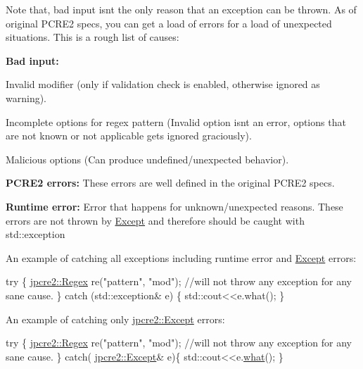 Note that, bad input isn\textquotesingle{}t the only reason that an exception can be thrown. As of original P\+C\+R\+E2 specs, you can get a load of errors for a load of unexpected situations. This is a rough list of causes\+:


\begin{DoxyEnumerate}
\item {\bfseries Bad input\+:}
\begin{DoxyEnumerate}
\item Invalid modifier (only if validation check is enabled, otherwise ignored as warning).
\item Incomplete options for regex pattern (Invalid option isn\textquotesingle{}t an error, options that are not known or not applicable gets ignored graciously).
\item Malicious options (Can produce undefined/unexpected behavior).
\end{DoxyEnumerate}
\item {\bfseries P\+C\+R\+E2 errors\+:} These errors are well defined in the original P\+C\+R\+E2 specs.
\item {\bfseries Runtime error\+:} Error that happens for unknown/unexpected reasons. These errors are not thrown by \hyperlink{classjpcre2_1_1Except}{Except} and therefore should be caught with std\+::exception
\end{DoxyEnumerate}

An example of catching all exceptions including runtime error and \hyperlink{classjpcre2_1_1Except}{Except} errors\+:


\begin{DoxyCode}
\textcolor{keywordflow}{try} \{
    \hyperlink{classjpcre2_1_1Regex}{jpcre2::Regex} re(\textcolor{stringliteral}{"pattern"}, \textcolor{stringliteral}{"mod"}); \textcolor{comment}{//will not throw any exception for any sane cause.}
\} \textcolor{keywordflow}{catch} (std::exception& e) \{
    std::cout<<e.what();
\}
\end{DoxyCode}


An example of catching only \hyperlink{classjpcre2_1_1Except}{jpcre2\+::\+Except} errors\+:


\begin{DoxyCode}
\textcolor{keywordflow}{try} \{
    \hyperlink{classjpcre2_1_1Regex}{jpcre2::Regex} re(\textcolor{stringliteral}{"pattern"}, \textcolor{stringliteral}{"mod"}); \textcolor{comment}{//will not throw any exception for any sane cause.}
\}
\textcolor{keywordflow}{catch}( \hyperlink{classjpcre2_1_1Except}{jpcre2::Except}& e)\{
    std::cout<<e.\hyperlink{classjpcre2_1_1Except_aa16bdec8432ee950955f7ad81a9655bb_aa16bdec8432ee950955f7ad81a9655bb}{what}();
\}
\end{DoxyCode}
 

